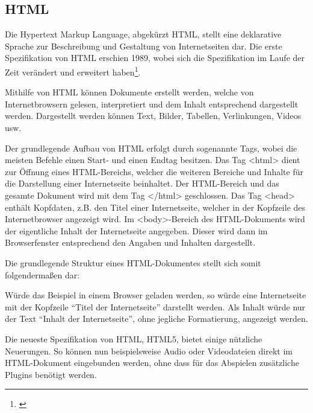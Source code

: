 \subsection{HTML}
\label{sec:Html}

Die Hypertext Markup Language, abgekürzt HTML, stellt eine deklarative Sprache
zur Beschreibung und Gestaltung von Internetseiten dar. Die erste Spezifikation
von HTML erschien 1989, wobei sich die Spezifikation im Laufe der Zeit
verändert und erweitert haben\footnote{\citet[S.~27ff]{taglinger2003}}.

Mithilfe von HTML können Dokumente erstellt werden, welche von Internetbrowsern
gelesen, interpretiert und dem Inhalt entsprechend dargestellt werden.
Dargestellt werden können Text, Bilder, Tabellen, Verlinkungen, Videos usw.

Der grundlegende Aufbau von HTML erfolgt durch sogenannte Tags, wobei
die meisten Befehle einen Start- und einen Endtag besitzen.
Das Tag <html> dient zur Öffnung eines HTML-Bereichs, welcher die weiteren
Bereiche und Inhalte für die Darstellung einer Internetseite beinhaltet. Der
HTML-Bereich und das gesamte Dokument wird mit dem Tag </html> geschlossen. Das
Tag <head> enthält Kopfdaten, z.B. den Titel einer Internetseite, welcher in
der Kopfzeile des Internetbrowser angezeigt wird. Im <body>-Bereich des
HTML-Dokuments wird der eigentliche Inhalt der Internetseite angegeben. Dieser
wird dann im Browserfenster entsprechend den Angaben und Inhalten dargestellt.

Die grundlegende Struktur eines HTML-Dokumentes stellt sich somit folgendermaßen
dar:



Würde das Beispiel in einem Browser geladen werden, so würde eine
Internetseite mit der Kopfzeile "`Titel der Internetseite"' darstellt werden.
Als Inhalt würde nur der Text "`Inhalt der Internetseite"', ohne jegliche
Formatierung, angezeigt werden.

Die neueste Spezifikation von HTML, HTML5, bietet einige nützliche Neuerungen.
So können nun beispielsweise Audio oder Videodateien direkt im
HTML-Dokument eingebunden werden, ohne dass für das Abspielen zusätzliche
Plugins benötigt werden.

